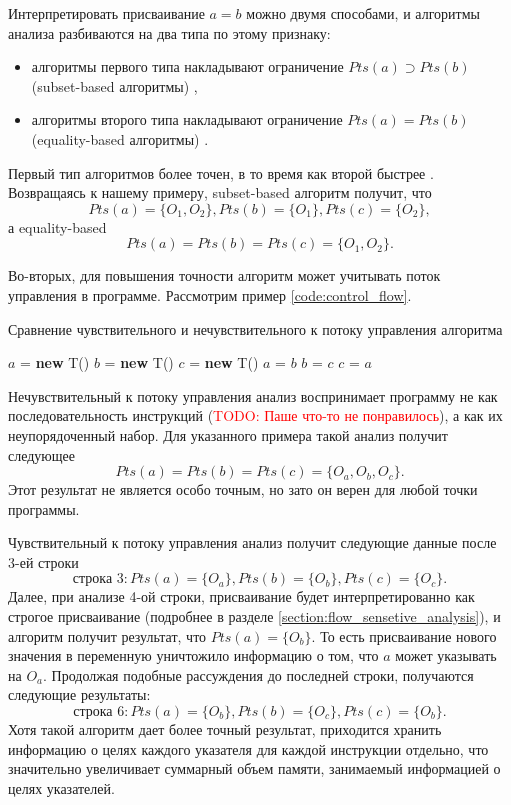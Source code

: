 \documentclass[14pt,titlepage]{extarticle}
\newcommand{\NEW}{\textbf{new }}
\newcommand{\todo}[1]{\textcolor{red}{\eng{TODO}: #1}}
\newcommand{\eng}[1]{{\English#1}}
\begin{document}
      Интерпретировать присваивание $a = b$ можно двумя способами,
      и алгоритмы анализа разбиваются на два типа по этому признаку:
      \begin{itemize}
        \item алгоритмы первого типа накладывают ограничение
              $Pts(a) \supset Pts(b)$ (\eng{subset-based} алгоритмы)
              \cite{rayside_overview},
        \item алгоритмы второго типа накладывают ограничение
              $Pts(a) = Pts(b)$ (\eng{equality-based} алгоритмы)
              \cite{rayside_overview}.
      \end{itemize}
      Первый тип алгоритмов более точен, в то время как второй быстрее
      \cite{steensgaard}. Возвращаясь к нашему примеру, \eng{subset-based}
      алгоритм получит, что
      \[Pts(a) = \{O_1, O_2\}, Pts(b) = \{O_1\}, Pts(c) = \{O_2\},\]
      а \eng{equality-based}
      \[Pts(a) = Pts(b) = Pts(c) = \{O_1, O_2\}.\]

      Во-вторых, для повышения точности алгоритм может учитывать поток управления
      в программе.
      Рассмотрим пример \ref{code:control_flow}.
      \begin{algorithm}
        \caption{Сравнение чувствительного и нечувствительного к потоку
                 управления алгоритма}
        \label{code:control_flow}
        \begin{algorithmic}[1]
          \STATE $a$ = \NEW T()
          \STATE $b$ = \NEW T()
          \STATE $c$ = \NEW T()
          \STATE $a$ = $b$
          \STATE $b$ = $c$
          \STATE $c$ = $a$
        \end{algorithmic}
      \end{algorithm}

      Нечувствительный к потоку управления анализ воспринимает программу не как
      последовательность инструкций (\todo{Паше что-то не понравилось}),
      а как их неупорядоченный набор.
      Для указанного примера такой анализ получит следующее
      \[Pts(a) = Pts(b) = Pts(c) = \{O_a, O_b, O_c\}.\]
      Этот результат не является особо точным, но зато он верен
      для любой точки программы.

      Чувствительный к потоку управления анализ получит следующие данные после
      3-ей строки
      \[\textrm{строка 3}:
          Pts(a) = \{O_a\}, Pts(b) = \{O_b\}, Pts(c) = \{O_c\}.\]
      Далее, при анализе 4-ой строки, присваивание будет интерпретированно как
      строгое присваивание (подробнее в разделе
      \ref{section:flow_sensetive_analysis}), и алгоритм получит
      результат, что $Pts(a) = \{O_b\}$. То есть присваивание нового значения
      в переменную уничтожило информацию о том, что $a$ может указывать на $O_a$.
      Продолжая подобные рассуждения до последней строки, получаются следующие
      результаты:
      \[\textrm{строка 6}:
          Pts(a) = \{O_b\}, Pts(b) = \{O_c\}, Pts(c) = \{O_b\}.\]
      Хотя такой алгоритм дает более точный результат, приходится хранить
      информацию о целях каждого указателя для каждой инструкции отдельно,
      что значительно увеличивает суммарный объем памяти, занимаемый
      информацией о целях указателей.
\end{document}
